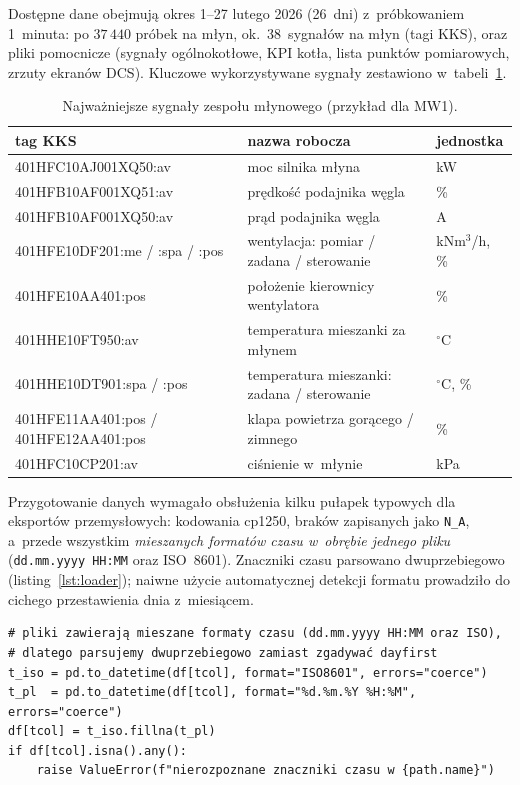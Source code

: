 \documentclass[11pt,a4paper]{article}
\begin{document}
Dostępne dane obejmują okres 1--27 lutego 2026 (26~dni) z~próbkowaniem
1~minuta: po $37\,440$ próbek na młyn, ok.\ 38~sygnałów na młyn (tagi KKS),
oraz pliki pomocnicze (sygnały ogólnokotłowe, KPI kotła, lista punktów
pomiarowych, zrzuty ekranów DCS). Kluczowe wykorzystywane sygnały zestawiono
w~tabeli~\ref{tab:sygnaly}.

\begin{table}[H]
\centering\small
\caption{Najważniejsze sygnały zespołu młynowego (przykład dla MW1).}
\label{tab:sygnaly}
\begin{tabular}{lll}
\toprule
tag KKS & nazwa robocza & jednostka \\
\midrule
401HFC10AJ001XQ50:av & moc silnika młyna & kW \\
401HFB10AF001XQ51:av & prędkość podajnika węgla & \% \\
401HFB10AF001XQ50:av & prąd podajnika węgla & A \\
401HFE10DF201:me / :spa / :pos & wentylacja: pomiar / zadana / sterowanie & kNm$^3$/h, \% \\
401HFE10AA401:pos & położenie kierownicy wentylatora & \% \\
401HHE10FT950:av & temperatura mieszanki za młynem & $^\circ$C \\
401HHE10DT901:spa / :pos & temperatura mieszanki: zadana / sterowanie & $^\circ$C, \% \\
401HFE11AA401:pos / 401HFE12AA401:pos & klapa powietrza gorącego / zimnego & \% \\
401HFC10CP201:av & ciśnienie w~młynie & kPa \\
\bottomrule
\end{tabular}
\end{table}

Przygotowanie danych wymagało obsłużenia kilku pułapek typowych dla eksportów
przemysłowych: kodowania cp1250, braków zapisanych jako \texttt{N\_A},
a~przede wszystkim \emph{mieszanych formatów czasu w~obrębie jednego pliku}
(\texttt{dd.mm.yyyy HH:MM} oraz ISO~8601). Znaczniki czasu parsowano
dwuprzebiegowo (listing~\ref{lst:loader}); naiwne użycie automatycznej
detekcji formatu prowadziło do cichego przestawienia dnia z~miesiącem.

\begin{lstlisting}[caption={Dwuprzebiegowe parsowanie znaczników czasu (\texttt{src/loader.py}).},label={lst:loader}]
# pliki zawierają mieszane formaty czasu (dd.mm.yyyy HH:MM oraz ISO),
# dlatego parsujemy dwuprzebiegowo zamiast zgadywać dayfirst
t_iso = pd.to_datetime(df[tcol], format="ISO8601", errors="coerce")
t_pl  = pd.to_datetime(df[tcol], format="%d.%m.%Y %H:%M", errors="coerce")
df[tcol] = t_iso.fillna(t_pl)
if df[tcol].isna().any():
    raise ValueError(f"nierozpoznane znaczniki czasu w {path.name}")
\end{lstlisting}
\end{document}
